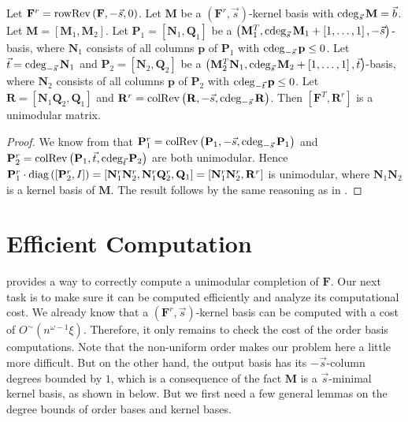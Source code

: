 \begin{lem}
\label{lem:unimodularComputationByRows}Let $\mathbf{F}^{r}=\operatorname{rowRev}\left(\mathbf{F},-\vec{s},0\right)$.
Let $\mathbf{M}$ be a $(\mathbf{F}^{r},\vec{s})$-kernel basis with
$\cdeg_{\vec{s}}\mathbf{M}=\vec{b}$. Let $\mathbf{M}=\left[\mathbf{M}_{1},\mathbf{M}_{2}\right]$.
Let $\mathbf{P}_{1}=\left[\mathbf{N}_{1},\mathbf{Q}_{1}\right]$ be
a $\left(\mathbf{M}_{1}^{T},\cdeg_{\vec{s}}\mathbf{M}_{1}+\left[1,\dots,1\right],-\vec{s}\right)$-basis,
where $\mathbf{N}_{1}$ consists of all columns $\mathbf{p}$ of $\mathbf{P}_{1}$
with $\cdeg_{-\vec{s}}\mathbf{p}\le0$. Let $\vec{t}=\cdeg_{-\vec{s}}\mathbf{N}_{1}$
and $\mathbf{P}_{2}=\left[\mathbf{N}_{2},\mathbf{Q}_{2}\right]$ be
a $\left(\mathbf{M}_{2}^{T}\mathbf{N}_{1},\cdeg_{\vec{s}}\mathbf{M}_{2}+\left[1,\dots,1\right],\vec{t}\right)$-basis,
where $\mathbf{N}_{2}$ consists of all columns $\mathbf{p}$ of $\mathbf{P}_{2}$
with $\cdeg_{-\vec{t}}\mathbf{p}\le0$. Let $\mathbf{R}=\left[\mathbf{N}_{1}\mathbf{Q}_{2},\mathbf{Q}_{1}\right]$
and $\mathbf{R}^{r}=\colRev\left(\mathbf{R},-\vec{s},\cdeg_{-\vec{s}}\mathbf{R}\right)$.
Then $\left[\mathbf{F}^{T},\mathbf{R}^{r}\right]$ is a unimodular
matrix.\end{lem}
\begin{proof}
We know from  that $\mathbf{P}_{1}^{r}=\colRev\left(\mathbf{P}_{1},-\vec{s},\cdeg_{-\vec{s}}\mathbf{P}_{1}\right)$
and $\mathbf{P}_{2}^{r}=\colRev\left(\mathbf{P}_{1},\vec{t},\cdeg_{\vec{t}}\mathbf{P}_{2}\right)$
are both unimodular. Hence $\mathbf{P}_{1}^{r}\cdot\mbox{diag}\left(\left[\mathbf{P}_{2}^{r},I\right]\right)=\left[\mathbf{N}_{1}^{r}\mathbf{N}_{2}^{r},\mathbf{N}_{1}^{r}\mathbf{Q}_{2}^{r},\mathbf{Q}_{1}\right]=\left[\mathbf{N}_{1}^{r}\mathbf{N}_{2}^{r},\mathbf{R}^{r}\right]$
is unimodular, where\textbf{ $\mathbf{N}_{1}\mathbf{N}_{2}$ }is a
kernel basis of $\mathbf{M}$. The result follows by the same reasoning
as in .
\end{proof}

\section{Efficient Computation}

 provides a way to correctly
compute a unimodular completion of $\mathbf{F}$. Our next task is
to make sure it can be computed efficiently and analyze its computational
cost. We already know that a $(\mathbf{F}^{r},\vec{s})$-kernel basis
can be computed with a cost of $O^{\sim}\left(n^{\omega-1}\xi\right)$.
Therefore, it only remains to check the cost of the order basis computations.
Note that the non-uniform order makes our problem here a little more
difficult. But on the other hand, the output basis has its $-\vec{s}$-column
degrees bounded by $1$, which is a consequence of the fact $\mathbf{M}$
is a $\vec{s}$-minimal kernel basis, as shown in 
below. But we first need a few general lemmas on the degree bounds
of order bases and kernel bases.

